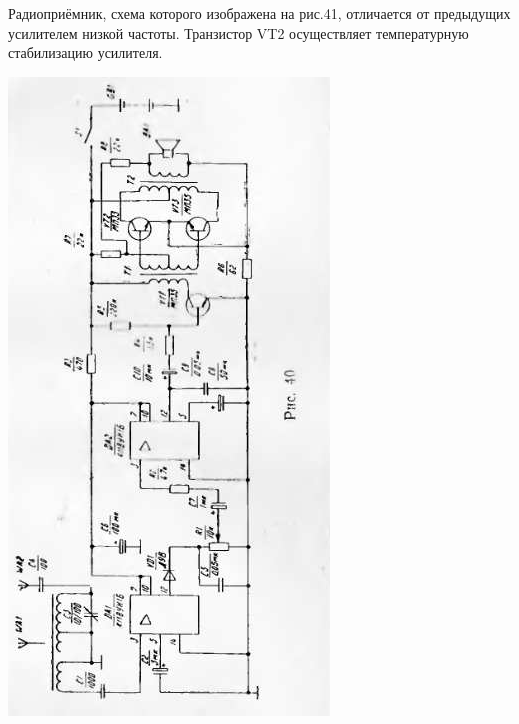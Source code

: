 \documentclass[12pt]{article}
\begin{document}
Радиоприёмник, схема которого изображена на рис.41, отличается от предыдущих усилителем низкой частоты. Транзистор VT2 осуществляет температурную стабилизацию усилителя.

\newpage

\hspace*{2.7cm}\includegraphics[scale=1.1, angle=0]{ekon3_039_1}

\newpage
\end{document}
